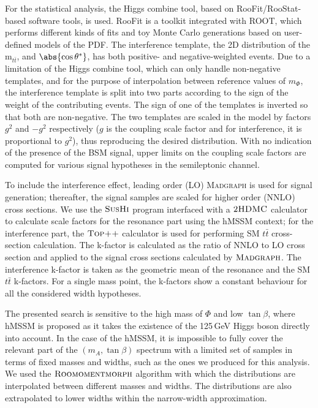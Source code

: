 For the statistical analysis, the Higgs combine tool, based on RooFit/RooStat-based software tools, is used. RooFit is a toolkit integrated with ROOT, which performs different kinds of fits and toy Monte Carlo generations based on user-defined models of the PDF. The interference template, the 2D distribution of the m$_{t\bar t}$, and $\abs{\cos\theta^*}$, has both positive- and negative-weighted events. Due to a limitation of the Higgs combine tool, which can only handle non-negative templates, and for the purpose of interpolation between reference values of $m_\Phi$, the interference template is split into two parts according to the sign of the weight of the contributing events.
The sign of one of the templates is inverted so that both are non-negative.
The two templates are scaled in the model by factors $g^2$ and $-g^2$ respectively ($g$ is the coupling scale factor and for interference, it is proportional to $g^2$), thus reproducing the desired distribution.
With no indication of the presence of the BSM signal, upper limits on the coupling scale factors are computed for various signal hypotheses in the semileptonic channel.

To include the interference effect, leading order (LO) \textsc{Madgraph} is used for signal generation; thereafter, the signal samples are scaled for higher order (NNLO) cross sections. We use the $\textsc{SusHi}$ program interfaced with a $\textsc{2HDMC}$ calculator to calculate scale factors for the resonance part using the hMSSM context; for the interference part, the $\textsc{Top++}$ calculator is used for performing SM $t\bar t$ cross-section calculation. The k-factor is calculated as the ratio of NNLO to LO cross section and applied to the signal cross sections calculated by $\textsc{Madgraph}$. The interference k-factor is taken as the geometric mean of the resonance and the SM $t\bar t$ k-factors. For a single mass point, the k-factors show a constant behaviour for all the considered width hypotheses.

The presented search is sensitive to the high mass of $\Phi$ and low $\tan\beta$, where hMSSM is proposed as it takes the existence of the 125\,GeV Higgs boson directly into account.  
In the case of the hMSSM, it is impossible to fully cover the relevant part of the $(m_A, \tan\beta)$ spectrum with a limited set of samples in terms of fixed masses and widths, such as the ones we produced for this analysis. We used the $\textsc{Roomomentmorph}$ algorithm with which the distributions are interpolated between different masses and widths. The distributions are also extrapolated to lower widths within the narrow-width approximation.

